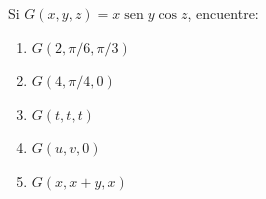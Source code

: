 \item Si $G(x, y, z) = x \operatorname{sen} y \cos z$, encuentre:
\begin{enumerate}[label=(\alph*)]
    \item $G(2, \pi/6, \pi/3)$
    \item $G(4, \pi/4, 0)$
    \item $G(t, t, t)$
    \item $G(u, v, 0)$
    \item $G(x, x+y, x)$
\end{enumerate}
